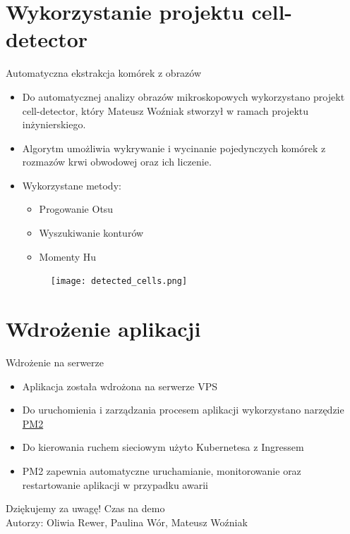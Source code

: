 \documentclass[polish,aspectratio=1610]{beamer}
\begin{document}
    \section{Wykorzystanie projektu cell-detector}
    \begin{frame}{Automatyczna ekstrakcja komórek z obrazów}
        \begin{itemize}
            \item Do automatycznej analizy obrazów mikroskopowych wykorzystano projekt cell-detector, który Mateusz Woźniak stworzył w ramach projektu inżynierskiego.
            \item Algorytm umożliwia wykrywanie i wycinanie pojedynczych komórek z rozmazów krwi obwodowej oraz ich liczenie.
            \item Wykorzystane metody:
            \begin{itemize}
                \item Progowanie Otsu
                \item Wyszukiwanie konturów 
                \item Momenty Hu
            \end{itemize}
            \begin{figure}
                \texttt{[image: detected\_cells.png]}
            \end{figure}
        \end{itemize}
    \end{frame}

    
    \section{Wdrożenie aplikacji}
    \begin{frame}{Wdrożenie na serwerze}
        \begin{itemize}
            \item Aplikacja została wdrożona na serwerze VPS
            \item Do uruchomienia i zarządzania procesem aplikacji wykorzystano narzędzie \href{https://pm2.keymetrics.io/}{PM2}
            \item Do kierowania ruchem sieciowym użyto Kubernetesa z Ingressem
            \item PM2 zapewnia automatyczne uruchamianie, monitorowanie oraz restartowanie aplikacji w przypadku awarii
        \end{itemize}
    \end{frame}

    
    
    \begin{frame}{Dziękujemy za uwagę!}
        \centering
        \Huge Czas na demo
        \\
        \vspace{2em}
        \large Autorzy: Oliwia Rewer, Paulina Wór, Mateusz Woźniak
    \end{frame}
\end{document}
